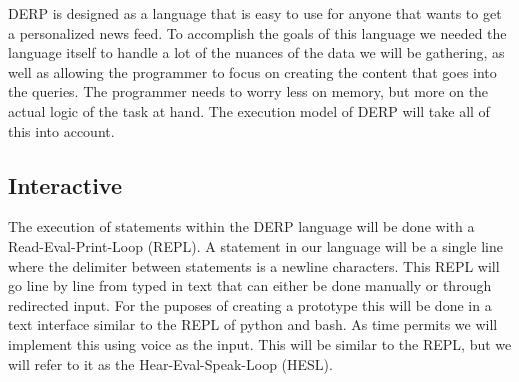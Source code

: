 DERP is designed as a language that is easy to use for anyone that wants to get a personalized news feed. To accomplish the goals of this language we needed the language itself to handle a lot of the nuances of the data we will be gathering, as well as allowing the programmer to focus on creating the content that goes into the queries. The programmer needs to worry less on memory, but more on the actual logic of the task at hand. The execution model of DERP will take all of this into account. 



\subsection{Interactive}
The execution of statements within the DERP language will be done with a Read-Eval-Print-Loop (REPL). A statement in our language will be a single line where the delimiter between statements is a newline characters. This REPL will go line by line from typed in text that can either be done manually or through redirected input. For the puposes of creating a prototype this will be done in a text interface similar to the REPL of python and bash. As time permits we will implement this using voice as the input. This will be similar to the REPL, but we will refer to it as the Hear-Eval-Speak-Loop (HESL).  
